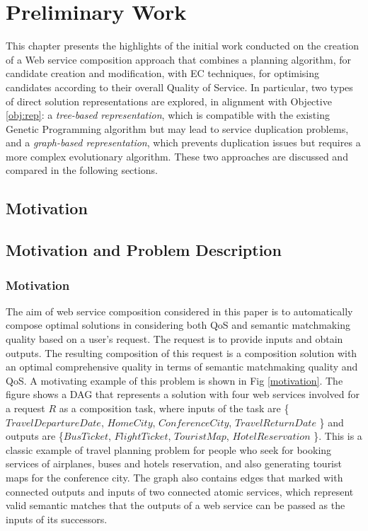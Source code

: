 \chapter{Preliminary Work}\label{C:preliminary}

This chapter presents the highlights of the initial work conducted on the creation of a Web service composition approach that combines a planning algorithm, for candidate creation and modification, with EC techniques, for optimising candidates according to their overall Quality of Service. In particular, two types of direct solution representations are explored, in alignment with Objective \ref{obj:rep}: a \textit{tree-based representation}, which is compatible with the existing Genetic Programming algorithm but may lead to service duplication problems, and a \textit{graph-based representation}, which prevents duplication issues but requires a more complex evolutionary algorithm. These two approaches are discussed and compared in the following sections.

\section{Motivation}
\section{Motivation and Problem Description}\label{Motivation and Problem Description}
\subsection{Motivation}\label{Motivation}

The aim of web service composition considered in this paper is to automatically compose optimal solutions in considering both QoS and semantic matchmaking quality based on a user's request. The request is to provide inputs and obtain outputs. The resulting composition of this request is a composition solution with an optimal comprehensive quality in terms of semantic matchmaking quality and QoS. A motivating example of this problem is shown in Fig \ref{motivation}. The figure shows a DAG that represents a solution with four web services involved for a request $R$ as a composition task, where inputs of the task are \{$TravelDepartureDate$, $HomeCity$, $ConferenceCity$, $TravelReturnDate$ \} and outputs are \{$BusTicket$, $FlightTicket$, $TouristMap$, $HotelReservation$ \}. This is a classic example of travel planning problem for people who seek for booking services of airplanes, buses and hotels reservation, and also generating tourist maps for the conference city. The graph also contains edges that marked with connected outputs and inputs of two connected atomic services, which represent valid semantic matches that the outputs of a web service can be passed as the inputs of its successors.

